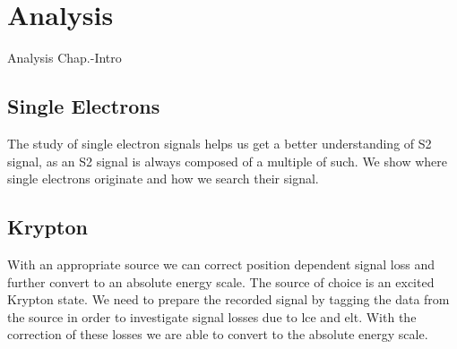 \FloatBarrier
\chapter{Analysis}
\label{chap:Analysis}
\FloatBarrier

Analysis Chap.-Intro

\FloatBarrier
\section{Single Electrons}
\label{sec:SE}
\FloatBarrier

The study of single electron signals helps us get a better understanding of S2 signal, as an S2 signal is always composed of a multiple of such.
We show where single electrons originate and how we search their signal.




\newpage

\newpage

\newpage

\newpage

\newpage

\FloatBarrier
\section{Krypton}
\label{sec:Kr}
\FloatBarrier

With an appropriate source we can correct position dependent signal loss and further convert to an absolute energy scale.
The source of choice is an excited Krypton state.
We need to prepare the recorded signal by tagging the data from the source in order to investigate signal losses due to \gls{lce} and \gls{elt}.
With the correction of these losses we are able to convert to the absolute energy scale.



\newpage

\newpage

\newpage

\newpage

\newpage

\newpage

\newpage

\newpage
\FloatBarrier
